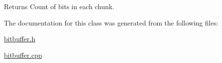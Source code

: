 \begin{DoxyReturn}{Returns}
Count of bits in each chunk. 
\end{DoxyReturn}


The documentation for this class was generated from the following files\+:\begin{DoxyCompactItemize}
\item 
\hyperlink{bitbuffer_8h}{bitbuffer.\+h}\item 
\hyperlink{bitbuffer_8cpp}{bitbuffer.\+cpp}\end{DoxyCompactItemize}
